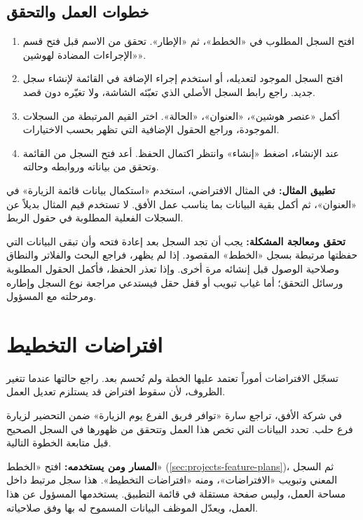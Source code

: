 \subsection{خطوات العمل والتحقق}
\begin{enumerate}
\item افتح السجل المطلوب في «الخطط»، ثم «الإطار». تحقق من الاسم قبل فتح قسم «الإجراءات المضادة لهوشين».
\item افتح السجل الموجود لتعديله، أو استخدم إجراء الإضافة في القائمة لإنشاء سجل جديد. راجع رابط السجل الأصلي الذي تعبّئه الشاشة، ولا تغيّره دون قصد.
\item أكمل «عنصر هوشين»، «العنوان»، «الحالة». اختر القيم المرتبطة من السجلات الموجودة، وراجع الحقول الإضافية التي تظهر بحسب الاختيارات.
\item عند الإنشاء، اضغط «إنشاء» وانتظر اكتمال الحفظ. أعد فتح السجل من القائمة وتحقق من بياناته وروابطه وحالته.
\end{enumerate}

\textbf{تطبيق المثال:} في المثال الافتراضي، استخدم «استكمال بيانات قائمة الزيارة» في «العنوان»، ثم أكمل بقية البيانات بما يناسب عمل الأفق. لا تستخدم قيم المثال بديلاً عن السجلات الفعلية المطلوبة في حقول الربط.

\textbf{تحقق ومعالجة المشكلة:} يجب أن تجد السجل بعد إعادة فتحه وأن تبقى البيانات التي حفظتها مرتبطة بسجل «الخطط» المقصود. إذا لم يظهر، فراجع البحث والفلاتر والنطاق وصلاحية الوصول قبل إنشائه مرة أخرى. وإذا تعذر الحفظ، فأكمل الحقول المطلوبة ورسائل التحقق؛ أما غياب تبويب أو قفل حقل فيستدعي مراجعة نوع السجل وإطاره ومرحلته مع المسؤول.

\clearpage
\section{افتراضات التخطيط}
\label{sec:projects-feature-planning-assumptions}

تسجّل الافتراضات أموراً تعتمد عليها الخطة ولم تُحسم بعد. راجع حالتها عندما تتغير الظروف، لأن سقوط افتراض قد يستلزم تعديل العمل.

\begin{rcnote}
في شركة الأفق، تراجع سارة «توافر فريق الفرع يوم الزيارة» ضمن التحضير لزيارة فرع حلب. تحدد البيانات التي تخص هذا العمل وتتحقق من ظهورها في السجل الصحيح قبل متابعة الخطوة التالية.
\end{rcnote}

\textbf{المسار ومن يستخدمه:} افتح «الخطط» (\ref{sec:projects-feature-plans})، ثم السجل المعني وتبويب «الافتراضات»، ومنه «افتراضات التخطيط». هذا سجل مرتبط داخل مساحة العمل، وليس صفحة مستقلة في قائمة التطبيق. يستخدمها المسؤول عن هذا العمل، ويعدّل الموظف البيانات المسموح له بها وفق صلاحياته.

